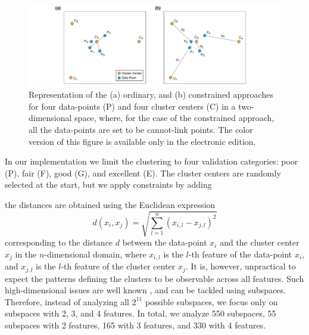 \begin{figure}[t]
	\centering
	\includegraphics[width=\textwidth]{figures/pdf/figure-04}
	\caption{Representation of the (a) ordinary, and (b) constrained \kmeans{} approaches for four data-points (P) and four cluster centers (C) in a two-dimensional space, where, for the case of the constrained \kmeans{} approach, all the data-points are set to be cannot-link points. The color version of this figure is available only in the electronic edition.}
	\label{fig:k-means}
\end{figure}

In our implementation we limit the clustering to four validation categories: poor (P), fair (F), good (G), and excellent (E). The cluster centers are randomly selected at the start, but we apply constraints by adding 

 the distances are obtained using the Euclidean expression
% 
\begin{equation}
	d(x_i, x_j) = \sqrt{ \sum_{l=1}^{n} \left( x_{i,l} - x_{j,l} \right)^2 } 
\end{equation}
% 
corresponding to the distance $d$ between the data-point $x_i$ and the cluster center $x_j$ in the $n$-dimensional domain, where $x_{i,l}$ is the $l$-th feature of the data-point $x_i$, and $x_{j,l}$ is the $l$-th feature of the cluster center $x_j$. It is, however, unpractical to expect the patterns defining the clusters to be observable across all features. Such high-dimensional issues are well known \citep[see, for instance,][]{Parsons_2004_ACM, Dy_2004_MLR}, and can be tackled using subspaces. Therefore, instead of analyzing all $2^{11}$ possible subspaces, we focus only on subspaces with 2, 3, and 4 features. In total, we analyze 550 subspaces, 55 subspaces with 2 features, 165 with 3 features, and 330 with 4 features.

